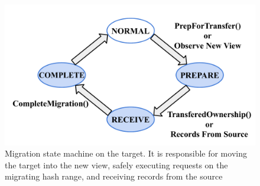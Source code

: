 \begin{figure}[t]
\centering
\includegraphics[width=\columnwidth]{figures/target.pdf}
\caption{Migration state machine on the target. It is
    responsible for moving the target into the new view,
    safely executing requests on the migrating hash
    range, and receiving records from the source}
\label{fig:target}
\end{figure}
